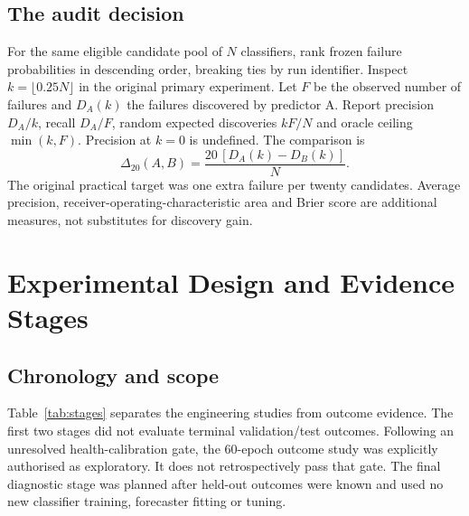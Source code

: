 \documentclass[nolineno]{ieeeaccess}
\newcommand{\Dtwenty}{\Delta_{20}}
\begin{document}
\subsection{The audit decision}
For the same eligible candidate pool of $N$ classifiers, rank frozen failure probabilities in descending order, breaking ties by run identifier. Inspect $k=\lfloor0.25N\rfloor$ in the original primary experiment. Let $F$ be the observed number of failures and $D_A(k)$ the failures discovered by predictor A. Report precision $D_A/k$, recall $D_A/F$, random expected discoveries $kF/N$ and oracle ceiling $\min(k,F)$. Precision at $k=0$ is undefined. The comparison is
\begin{equation}
\Dtwenty(A,B)=\frac{20\,[D_A(k)-D_B(k)]}{N}.
\label{eq:gain}
\end{equation}
The original practical target was one extra failure per twenty candidates. Average precision, receiver-operating-characteristic area and Brier score are additional measures, not substitutes for discovery gain.

\section{Experimental Design and Evidence Stages}
\label{sec:experiments}
\subsection{Chronology and scope}
Table~\ref{tab:stages} separates the engineering studies from outcome evidence. The first two stages did not evaluate terminal validation/test outcomes. Following an unresolved health-calibration gate, the 60-epoch outcome study was explicitly authorised as exploratory. It does not retrospectively pass that gate. The final diagnostic stage was planned after held-out outcomes were known and used no new classifier training, forecaster fitting or tuning.
\end{document}
